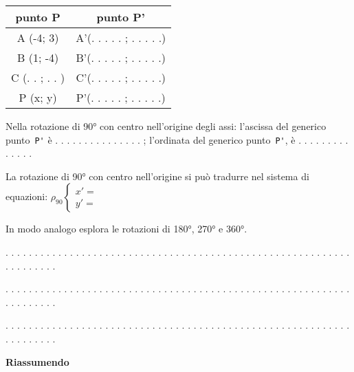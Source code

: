 \begin{center}\begin{tabular}{|c|c|}
\hline

punto P
 & 
punto P'
\\
\hline
A (-4; 3)
 & 
A'(. . . . . ; . . . . .)
\\
\hline
B (1; -4)
 & 
B'(. . . . . ; . . . . .)
\\
\hline
C (. . ; . . )
 & 
C'(. . . . . ; . . . . .)
\\
\hline
P (x; y)
 & 
P'(. . . . . ; . . . . .)
\\
\hline\end{tabular}\end{center}


Nella rotazione di 90° con centro nell'origine degli assi:
l'ascissa del generico punto~\lstinline{P'} è . . . . . . . . . . . . . . . ;
l'ordinata del generico punto~\lstinline{P'}, è . . . . . . . . . . . . . .

La rotazione di 90° con centro nell'origine si può tradurre nel sistema di
equazioni:
\(\rho_{90} \left \{
\begin{array}{l}
x' =  \\
y' =
\end{array} \right .\)

In modo analogo esplora le rotazioni di 180°, 270° e 360°.

. . . . . . . . . . . . . . . . . . . . . . . . . . . . . . . . . . . . . . . .
. . . . . . . . . . . . . . . . . . . . . . . . . . . .

. . . . . . . . . . . . . . . . . . . . . . . . . . . . . . . . . . . . . . . .
. . . . . . . . . . . . . . . . . . . . . . . . . . . .

. . . . . . . . . . . . . . . . . . . . . . . . . . . . . . . . . . . . . . . .
. . . . . . . . . . . . . . . . . . . . . . . . . . . .

\textbf{Riassumendo}


